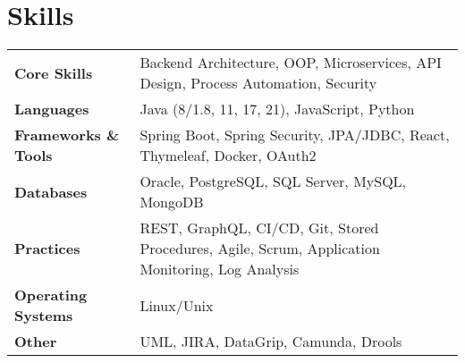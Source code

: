 \section{\textbf{Skills}}

\begin{tabularx}{\linewidth}{@{}l X@{}}
    \textbf{Core Skills} & Backend Architecture, OOP, Microservices, API Design, Process Automation, Security \\
    \textbf{Languages} & Java (8/1.8, 11, 17, 21), JavaScript, Python \\
    \textbf{Frameworks \& Tools} & Spring Boot, Spring Security, JPA/JDBC, React, Thymeleaf, Docker, OAuth2 \\
    \textbf{Databases} & Oracle, PostgreSQL, SQL Server, MySQL, MongoDB \\
    \textbf{Practices} & REST, GraphQL, CI/CD, Git, Stored Procedures, Agile, Scrum, Application Monitoring, Log Analysis \\
    \textbf{Operating Systems} & Linux/Unix \\
    \textbf{Other} & UML, JIRA, DataGrip, Camunda, Drools \\
\end{tabularx}
